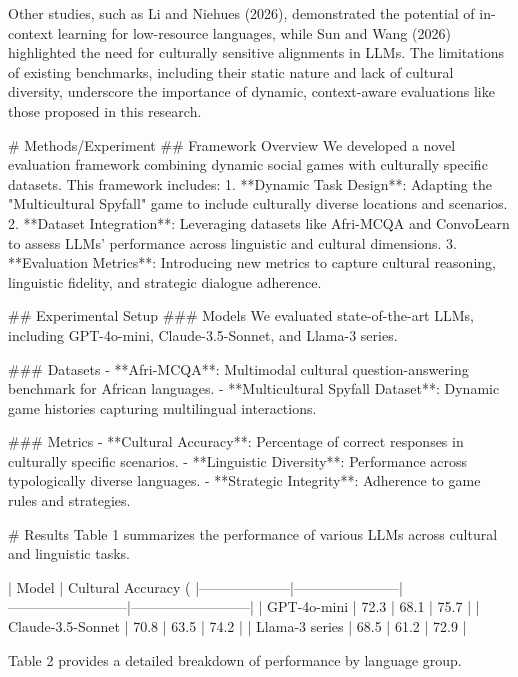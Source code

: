 Other studies, such as Li and Niehues (2026), demonstrated the potential of in-context learning for low-resource languages, while Sun and Wang (2026) highlighted the need for culturally sensitive alignments in LLMs. The limitations of existing benchmarks, including their static nature and lack of cultural diversity, underscore the importance of dynamic, context-aware evaluations like those proposed in this research.

# Methods/Experiment  
## Framework Overview  
We developed a novel evaluation framework combining dynamic social games with culturally specific datasets. This framework includes:  
1. **Dynamic Task Design**: Adapting the "Multicultural Spyfall" game to include culturally diverse locations and scenarios.  
2. **Dataset Integration**: Leveraging datasets like Afri-MCQA and ConvoLearn to assess LLMs' performance across linguistic and cultural dimensions.  
3. **Evaluation Metrics**: Introducing new metrics to capture cultural reasoning, linguistic fidelity, and strategic dialogue adherence.  

## Experimental Setup  
### Models  
We evaluated state-of-the-art LLMs, including GPT-4o-mini, Claude-3.5-Sonnet, and Llama-3 series.  

### Datasets  
- **Afri-MCQA**: Multimodal cultural question-answering benchmark for African languages.  
- **Multicultural Spyfall Dataset**: Dynamic game histories capturing multilingual interactions.  

### Metrics  
- **Cultural Accuracy**: Percentage of correct responses in culturally specific scenarios.  
- **Linguistic Diversity**: Performance across typologically diverse languages.  
- **Strategic Integrity**: Adherence to game rules and strategies.

# Results  
Table 1 summarizes the performance of various LLMs across cultural and linguistic tasks.  

| Model              | Cultural Accuracy (%
|--------------------|-----------------------|--------------------------|--------------------------|  
| GPT-4o-mini        | 72.3                 | 68.1                    | 75.7                    |  
| Claude-3.5-Sonnet  | 70.8                 | 63.5                    | 74.2                    |  
| Llama-3 series     | 68.5                 | 61.2                    | 72.9                    |  

Table 2 provides a detailed breakdown of performance by language group.  

